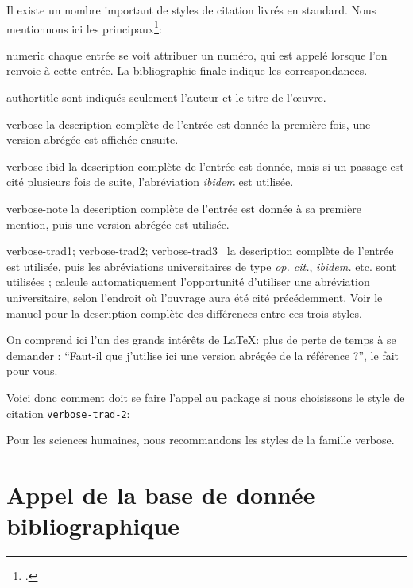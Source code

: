 Il existe un nombre important de styles de citation livrés en standard. Nous mentionnons ici les principaux\footcite[Se reporter pour plus de détails à][]{biblatex_style}:
\begin{choix}
\item[numeric]chaque entrée se voit attribuer un numéro, qui est appelé lorsque l'on renvoie à cette entrée. La bibliographie finale indique les correspondances.
\item[authortitle]sont indiqués seulement l'auteur et le titre de l'œuvre.
\item[verbose]la description complète de l'entrée est donnée la première fois, une version abrégée est affichée ensuite.
\item[verbose-ibid]la description complète de l'entrée est donnée, mais si un passage est cité plusieurs fois de suite, l'abréviation \emph{ibidem} est utilisée.
\item[verbose-note]la description complète de l'entrée est donnée à sa première mention, puis une version abrégée est utilisée.
\item[verbose-trad1; verbose-trad2; verbose-trad3]~la description complète de l'entrée est utilisée, puis les abréviations universitaires de type \emph{op. cit.}, \emph{ibidem.} etc. sont utilisées ;  calcule automatiquement l'opportunité d'utiliser une abréviation universitaire, selon l'endroit où l'ouvrage aura été cité précédemment. Voir le manuel pour la description complète des différences entre ces trois styles.
\end{choix}

On comprend ici l'un des grands intérêts de \LaTeX : plus de perte de temps à se demander : \enquote{Faut-il que j'utilise ici une version abrégée de la référence ?},  le fait pour vous.

Voici donc comment doit se faire l'appel au package si nous choisissons le style de citation \verb|verbose-trad-2|:

\begin{latexcode}
\usepackage[citestyle=verbose-trad2]{biblatex}
\end{latexcode}

Pour les sciences humaines, nous recommandons les styles de la famille verbose.


\section{Appel de la base de donnée bibliographique}


